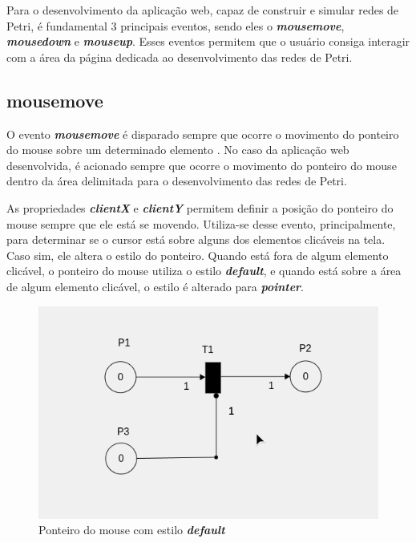 \documentclass[
	12pt,				%
	openright,			%
	oneside,			%
	a4paper,			%
	english,			%
	brazil				%
	]{abntex2}
\begin{document}
Para o desenvolvimento da aplicação web, capaz de construir e simular redes de Petri, é fundamental 3 principais eventos, sendo eles o \textbf{\textit{mousemove}}, \textbf{\textit{mousedown}} e \textbf{\textit{mouseup}}. Esses eventos permitem que o usuário consiga interagir com a área da página dedicada ao desenvolvimento das redes de Petri. 

\subsection*{mousemove}

O evento \textbf{\textit{mousemove}} é disparado sempre que ocorre o movimento do ponteiro do mouse sobre um determinado elemento \cite{mdn_mousemove_event}. No caso da aplicação web desenvolvida, é acionado sempre que ocorre o movimento do ponteiro do mouse dentro da área delimitada para o desenvolvimento das redes de Petri. 



As propriedades \textbf{\textit{clientX}} e \textbf{\textit{clientY}} permitem definir a posição do ponteiro do mouse sempre que ele está se movendo. Utiliza-se desse evento, principalmente, para determinar se o cursor está sobre alguns dos elementos clicáveis na tela. Caso sim, ele altera o estilo do ponteiro. Quando está fora de algum elemento clicável, o ponteiro do mouse utiliza o estilo \textbf{\textit{default}}, e quando está sobre a área de algum elemento clicável, o estilo é alterado para \textbf{\textit{pointer}}.

\begin{figure}[ht] 
	\centering
	\includegraphics[scale=0.4]{figuras/mouse_estilo_default.png}
	\caption[Mouse estilo default]{Ponteiro do mouse com estilo \textbf{\textit{default}}}
	\label{fig:mouse_estilo_default}
\end{figure}
\end{document}
